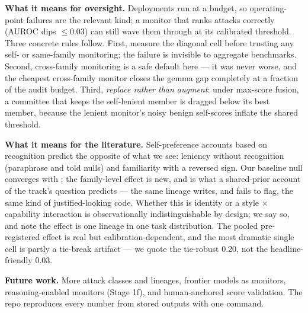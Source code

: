 \documentclass[11pt]{article}
\begin{document}
\textbf{What it means for oversight.} Deployments run at a budget, so operating-point failures are the relevant kind;
a monitor that ranks attacks correctly (AUROC dips $\leq$0.03) can still wave them through at its calibrated threshold.
Three concrete rules follow. First, measure the diagonal cell before trusting any self- or same-family monitoring;
the failure is invisible to aggregate benchmarks. Second, cross-family monitoring is a safe default here --- it was
never worse, and the cheapest cross-family monitor closes the gemma gap completely at a fraction of the audit budget.
Third, \emph{replace rather than augment}: under max-score fusion, a committee that keeps the self-lenient member is
dragged below its best member, because the lenient monitor's noisy benign self-scores inflate the shared threshold.

\textbf{What it means for the literature.} Self-preference accounts based on recognition \citep{panickssery2024}
predict the opposite of what we see: leniency without recognition (paraphrase and told nulls) and familiarity with a
reversed sign. Our baseline null converges with \citet{khullar2026}; the family-level effect is new, and is what a
shared-prior account of the track's question predicts --- the same lineage writes, and fails to flag, the same kind of
justified-looking code. Whether this is identity or a style $\times$ capability interaction is observationally
indistinguishable by design; we say so, and note the effect is one lineage in one task distribution. The pooled
pre-registered effect is real but calibration-dependent, and the most dramatic single cell is partly a tie-break
artifact --- we quote the tie-robust 0.20, not the headline-friendly 0.03.

\textbf{Future work.} More attack classes and lineages, frontier models as monitors, reasoning-enabled monitors
(Stage 1f), and human-anchored score validation. The repo reproduces every number from stored outputs with one command.
\end{document}
